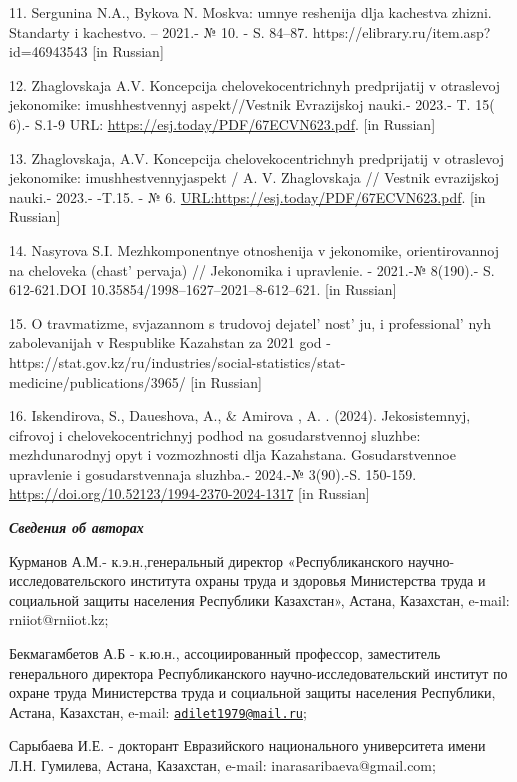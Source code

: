 11. Sergunina N.A., Bykova N. Moskva: umnye reshenija dlja kachestva
zhizni. Standarty i kachestvo. -- 2021.- № 10. - S. 84--87.
https://elibrary.ru/item.asp?id=46943543 {[}in Russian{]}

12. Zhaglovskaja A.V. Koncepcija chelovekocentrichnyh predprijatij v
otraslevoj jekonomike: imushhestvennyj aspekt//Vestnik Evrazijskoj
nauki.- 2023.- T. 15( 6).- S.1-9 URL:
\url{https://esj.today/PDF/67ECVN623.pdf}. {[}in Russian{]}

13. Zhaglovskaja, A.V. Koncepcija chelovekocentrichnyh predprijatij v
otraslevoj jekonomike: imushhestvennyjaspekt / A. V. Zhaglovskaja //
Vestnik evrazijskoj nauki.- 2023.- -T.15. - № 6.
\url{URL:https://esj.today/PDF/67ECVN623.pdf}. {[}in Russian{]}

14. Nasyrova S.I. Mezhkomponentnye otnoshenija v jekonomike,
orientirovannoj na cheloveka (chast'{} pervaja) //
Jekonomika i upravlenie. - 2021.-№ 8(190).- S. 612-621.DOI
10.35854/1998--1627--2021--8-612--621. {[}in Russian{]}

15. O travmatizme, svjazannom s trudovoj
dejatel' nost' ju, i
professional' nyh zabolevanijah v Respublike Kazahstan za
2021 god -
https://stat.gov.kz/ru/industries/social-statistics/stat-medicine/publications/3965/
{[}in Russian{]}

16. Iskendirova, S., Daueshova, A., \& Amirova , A. . (2024).
Jekosistemnyj, cifrovoj i chelovekocentrichnyj podhod na gosudarstvennoj
sluzhbe: mezhdunarodnyj opyt i vozmozhnosti dlja Kazahstana.
Gosudarstvennoe upravlenie i gosudarstvennaja sluzhba.- 2024.-№
3(90).-S. 150-159. \url{https://doi.org/10.52123/1994-2370-2024-1317}
{[}in Russian{]}

\emph{{\bfseries Сведения об авторах}}

Курманов А.М.- к.э.н.,генеральный директор «Республиканского
научно-исследовательского института охраны труда и здоровья Министерства
труда и социальной защиты населения Республики Казахстан», Астана,
Казахстан, e-mail: rniiot@rniiot.kz;

Бекмагамбетов А.Б - к.ю.н., ассоциированный профессор, заместитель
генерального директора Республиканского научно-исследовательский
институт по охране труда Министерства труда и социальной защиты
населения Республики, Астана, Казахстан, e-mail:
\href{mailto:adilet1979@mail.ru}{\nolinkurl{adilet1979@mail.ru}};

Сарыбаева И.Е. - докторант Евразийского национального университета имени
Л.Н. Гумилева, Астана, Казахстан, e-mail: inarasaribaeva@gmail.com;

